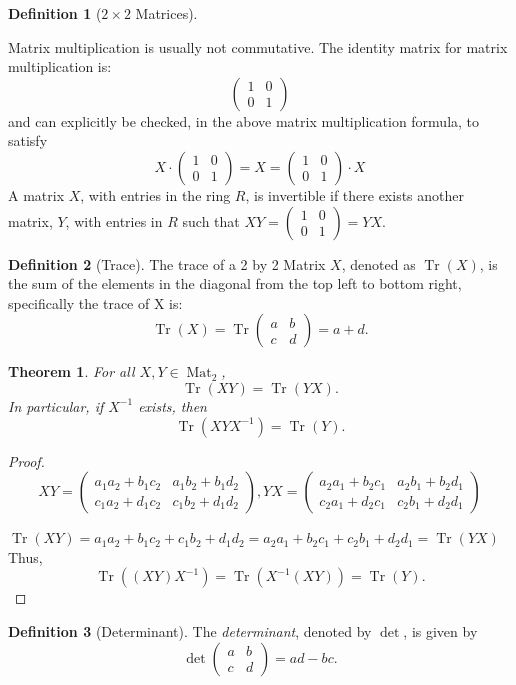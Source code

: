 \documentclass{article}
\newtheorem{thm}{Theorem}[section]
\theoremstyle{definition}
\newtheorem{definition}{Definition}[section]
\theoremstyle{definition}
\theoremstyle{definition}
\newcommand{\mat}{\operatorname{Mat}}
\newcommand{\Mabcd}{\begin{pmatrix} a&b\\c&d \end{pmatrix}}
\newcommand{\Tr}{\operatorname{Tr}}
\begin{document}
\begin{definition}[$2\times2$ Matrices]
\begin{itemize}
   \end{itemize}
   Matrix multiplication is usually not commutative.
   The identity matrix for matrix multiplication is: 
   $$\begin{pmatrix} {1}&{0}\\{0}&{1} \end{pmatrix}$$
   and can explicitly be checked, in the above matrix multiplication formula, to satisfy $$X\cdot\begin{pmatrix} {1}&{0}\\{0}&{1} \end{pmatrix}=X=\begin{pmatrix} {1}&{0}\\{0}&{1} \end{pmatrix}\cdot X$$
   A matrix $X$, with entries in the ring $R$, is invertible if there exists another matrix, $Y$, with entries in $R$ such that $XY=\begin{pmatrix} {1}&{0}\\{0}&{1} \end{pmatrix}=YX$.
\end{definition}

\begin{definition}[Trace]

The trace of a 2 by 2 Matrix $X$, denoted as $\Tr(X)$, is the sum of the elements in the diagonal from the top left to bottom right, specifically the trace of X is:
$$\Tr(X)= \Tr\Mabcd=a+d.$$

\end{definition}
\begin{thm}
    For all $X,Y\in\mat_2$,
    $$\Tr(XY)=\Tr(YX).$$
    In particular, if $X^{-1}$ exists, then
    $$\Tr(XYX^{-1})=\Tr(Y).$$
\end{thm}
\begin{proof}
    
$$XY=\begin{pmatrix} {a_1a_2+b_1c_2}&{a_1b_2+b_1d_2}\\{c_1a_2+d_1c_2}&{c_1b_2+d_1d_2} \end{pmatrix}, YX=\begin{pmatrix} {a_2a_1+b_2c_1}&{a_2b_1+b_2d_1}\\{c_2a_1+d_2c_1}&{c_2b_1+d_2d_1} \end{pmatrix}$$

$\Tr(XY)=a_1a_2+b_1c_2+c_1b_2+d_1d_2=a_2a_1+b_2c_1+c_2b_1+d_2d_1=\Tr(YX)$
Thus,
$$ \Tr((XY)X^{-1})=\Tr(X^{-1}(XY))=\Tr(Y).$$
\end{proof}
\begin{definition}[Determinant]
    
The \emph{determinant}, denoted by $\det$, is given by
$$\det\Mabcd=ad-bc.$$


\end{definition}
\end{document}
